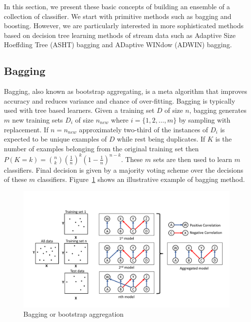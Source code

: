 In this section, we present these basic concepts of building an ensemble of a collection of classifier. We start with primitive methods such as bagging and boosting. However, we are particularly interested in more sophisticated methods based on decision tree learning methods of stream data such as Adaptive Size Hoeffding Tree (ASHT) bagging and ADaptive WINdow (ADWIN) bagging.

\subsection{Bagging}
\label{sec:bg:bagging}
Bagging, also known as bootstrap aggregating, is a meta algorithm that improves accuracy and reduces variance and chance of over-fitting. Bagging is typically used with tree based learners. Given a training set $D$ of size $n$, bagging generates $m$ new training sets $D_i$ of size $n_{new}$ where $i = \{1, 2, \dots, m\}$ by sampling with replacement. If $n = n_{new}$ approximately two-third of the instances of $D_i$ is expected to be unique examples of $D$ while rest being duplicates. If $K$ is the number of examples belonging from the original training set then $P(K=k) = \binom{n}{k} \left( \frac{1}{n}\right)^k \left(1- \frac{1}{n}\right)^{n-k}$. These $m$ sets are then used to learn $m$ classifiers. Final decision is given by a majority voting scheme over the decisions of these $m$ classifiers. Figure~\ref{fig:bg:bagging} shows an illustrative example of bagging method.
\begin{figure}[htbp]
    \begin{center}
        \includegraphics[width=14.0cm]{figs/bagging.pdf}
        \caption{Bagging or bootstrap aggregation}
        \label{fig:bg:bagging}
    \end{center}
\end{figure}

